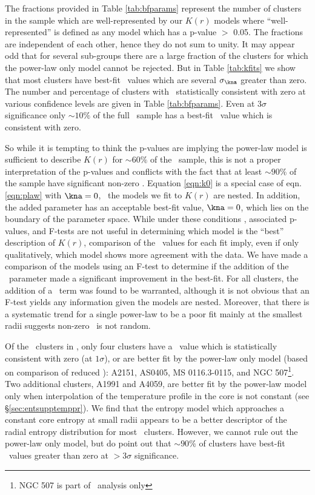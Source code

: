 The fractions provided in Table \ref{tab:bfparams} represent the
number of clusters in the sample which are well-represented by our
$K(r)$ models where ``well-represented'' is defined as any model which
has a p-value $>$ 0.05. The fractions are independent of each other,
hence they do not sum to unity. It may appear odd that for several
sub-groups there are a large fraction of the clusters for which the
power-law only model cannot be rejected. But in Table \ref{tab:kfits}
we show that most clusters have best-fit \kna\ values which are
several $\sigma_{\kna}$ greater than zero. The number and percentage
of clusters with \kna\ statistically consistent with zero at various
confidence levels are given in Table \ref{tab:bfparams}. Even at
$3\sigma$ significance only $\sim10\%$ of the full \accept\ sample has
a best-fit \kna\ value which is consistent with zero.

So while it is tempting to think the p-values are implying the
power-law model is sufficient to describe $K(r)$ for $\sim60\%$ of the
\accept\ sample, this is not a proper interpretation of the p-values
and conflicts with the fact that at least $\sim 90\%$ of the sample
have significant non-zero \kna. Equation \ref{eqn:k0} is a special
case of eqn. \ref{eqn:plaw} with $\kna = 0$, \eg\ the models we fit to
$K(r)$ are nested. In addition, the added parameter has an acceptable
best-fit value, $\kna = 0$, which lies on the boundary of the
parameter space. While under these conditions \chisq, associated
p-values, and F-tests are not useful in determining which model is the
``best'' description of $K(r)$, comparison of the \chisq\ values for
each fit imply, even if only qualitatively, which model shows more
agreement with the data. We have made a comparison of the models using
an F-test to determine if the addition of the \kna\ parameter made a
significant improvement in the best-fit. For all clusters, the
addition of a \kna\ term was found to be warranted, although it is not
obvious that an F-test yields any information given the models are
nested.  Moreover, that there is a systematic trend for a single
power-law to be a poor fit mainly at the smallest radii suggests
non-zero \kna\ is not random.

Of the \entsuppnum\ clusters in \accept, only four clusters have a
\kna\ value which is statistically consistent with zero (at
$1\sigma$), or are better fit by the power-law only model (based on
comparison of reduced \chisq): A2151, AS0405, MS 0116.3-0115, and NGC
507\footnote{NGC 507 is part of \hifl\ analysis only}. Two additional
clusters, A1991 and A4059, are better fit by the power-law model only
when interpolation of the temperature profile in the core is not
constant (see \S\ref{sec:entsupptemppr}). We find that the entropy
model which approaches a constant core entropy at small radii appears
to be a better descriptor of the radial entropy distribution for most
\accept\ clusters. However, we cannot rule out the power-law only
model, but do point out that $\sim90\%$ of clusters have best-fit
\kna\ values greater than zero at $> 3\sigma$ significance.

